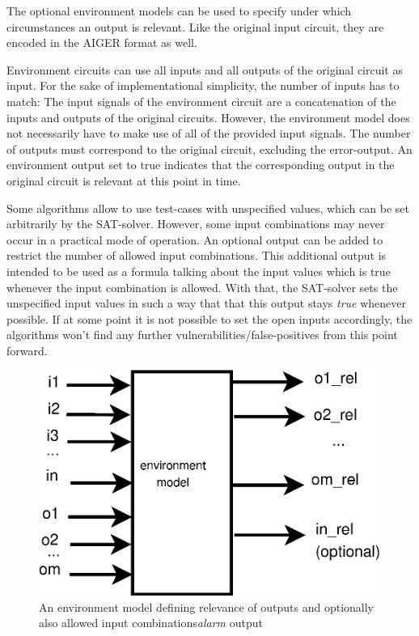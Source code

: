 \documentclass[a4paper,10pt]{article}
\begin{document}
The optional environment models can be used to specify under which circumstances an output is relevant. Like the original input circuit, they are 
encoded in the AIGER format as well. 

Environment circuits can use all inputs and all outputs of the original circuit as input. For the sake of implementational
simplicity, the number of inputs has to match: The input signals of the environment circuit are a concatenation of 
the inputs and outputs of the original circuits.
However, the environment model does not necessarily have to make use of all of the provided input signals.
The number of outputs must correspond to the original circuit, excluding the error-output. 
An environment output set to true indicates that the corresponding output in the original
circuit is relevant at this point in time.

Some algorithms allow to use test-cases with unspecified values, which can be set arbitrarily by the SAT-solver.
However, some input combinations may never occur in a practical mode of operation.
An optional output can be added to restrict the number of allowed input combinations. This additional output is
intended to be used as a formula talking about the input values which is true whenever the input combination is allowed.
With that, the SAT-solver sets the unspecified input values in such a way that that this output stays \emph{true} whenever possible.
If at some point it is not possible to set the open inputs accordingly, 
the algorithms won't find any further vulnerabilities/false-positives from this point forward.

\begin{figure}[!htb]
\centering
\includegraphics[scale = 0.48]{img/env.eps}
\centering \caption{An environment model defining relevance of outputs and optionally also allowed input combinations\emph{alarm} output} 
\label{env-img}
\end{figure}
\end{document}
